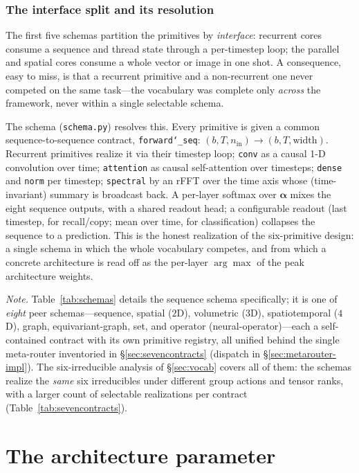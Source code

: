 \documentclass[11pt]{article}
\newcommand{\allowbreakhere}{\discretionary{}{}{}}
\newcommand{\code}[1]{\texttt{\def\_{\char`_\allowbreakhere}#1}}
\newcommand{\alphapar}{\bm{\alpha}}
\begin{document}
\subsubsection{The interface split and its resolution}
\label{sec:unified}

The first five schemas partition the primitives by \emph{interface}: recurrent cores
consume a sequence and thread state through a per-timestep loop; the parallel and spatial cores
consume a whole vector or image in one shot. A consequence, easy to miss, is that a recurrent
primitive and a non-recurrent one never competed on the same task---the vocabulary was complete
only \emph{across} the framework, never within a single selectable schema.

The schema (\code{schema.py}) resolves this. Every primitive is given a
common sequence-to-sequence contract, \code{forward\_seq}: $(b,T,n_{\mathrm{in}})\!\to\!(b,T,
\mathrm{width})$. Recurrent primitives realize it via their timestep loop; \code{conv} as a
causal 1-D convolution over time; \code{attention} as causal self-attention over timesteps;
\code{dense} and \code{norm} per timestep; \code{spectral} by an rFFT over the time axis whose
(time-invariant) summary is broadcast back. A per-layer softmax over $\alphapar$ mixes the eight
sequence outputs, with a shared readout head; a configurable readout (last timestep, for
recall/copy; mean over time, for classification) collapses the sequence to a prediction. This
is the honest realization of the six-primitive design: a single schema in which the whole
vocabulary competes, and from which a concrete architecture is read off as the per-layer
$\arg\max$ of the peak architecture weights.

\medskip
\noindent\emph{Note.} Table~\ref{tab:schemas} details the sequence schema specifically; it is one of
\emph{eight} peer schemas---sequence, spatial ($2$D), volumetric ($3$D), spatiotemporal ($4$D),
graph, equivariant-graph, set, and operator (neural-operator)---each a self-contained contract with its own
primitive registry, all unified behind the single meta-router inventoried in \S\ref{sec:sevencontracts}
(dispatch in \S\ref{sec:metarouter-impl}). The six-irreducible analysis of \S\ref{sec:vocab} covers all of
them: the schemas realize the \emph{same} six irreducibles under different group actions and tensor
ranks, with a larger count of selectable realizations per contract (Table~\ref{tab:sevencontracts}).

\section{The architecture parameter}
\label{sec:archparam-group}
\end{document}
